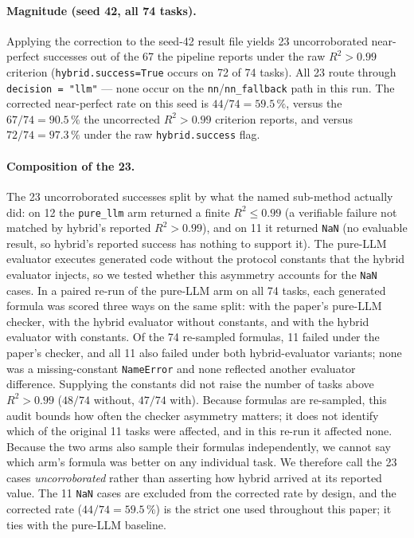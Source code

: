 \documentclass[twoside,11pt]{article}
\newcommand{\Rsq}{R^{2}}
\begin{document}
\paragraph{Magnitude (seed 42, all 74 tasks).}
Applying the correction to
the seed-42 result file yields
23 uncorroborated near-perfect successes out of the 67 the pipeline reports
under the raw $\Rsq>0.99$ criterion (\texttt{hybrid.success=True} occurs
on 72 of 74 tasks). All 23 route through
\texttt{decision = "llm"} --- none occur on the
\texttt{nn}/\texttt{nn\_fallback} path in this run. The corrected
near-perfect rate on this seed is $44/74 = 59.5\,\%$, versus the
$67/74 = 90.5\,\%$ the uncorrected $\Rsq>0.99$ criterion reports, and
versus $72/74=97.3\,\%$ under the raw \texttt{hybrid.success} flag.


\paragraph{Composition of the 23.} The 23 uncorroborated
successes split by what the named sub-method actually did: on 12 the
\texttt{pure\_llm} arm returned a finite $\Rsq\le0.99$ (a verifiable
failure not matched by hybrid's reported $\Rsq>0.99$), and on 11 it returned
\texttt{NaN} (no evaluable result, so hybrid's reported success has nothing to
support it). The pure-LLM evaluator executes generated code without the
protocol constants that the hybrid evaluator injects, so we tested whether
this asymmetry accounts for the \texttt{NaN} cases. In a paired re-run of the
pure-LLM arm on all 74 tasks, each generated formula was scored three ways on
the same split: with the paper's pure-LLM checker, with the hybrid evaluator
without constants, and with the hybrid evaluator with constants. Of the 74
re-sampled formulas, 11 failed under the paper's checker, and all 11 also
failed under both hybrid-evaluator variants; none was a missing-constant
\texttt{NameError} and none reflected another evaluator difference.
Supplying the constants did not raise the number of tasks above
$\Rsq>0.99$ ($48/74$ without, $47/74$ with). Because formulas are
re-sampled, this audit bounds how often the checker asymmetry matters; it does
not identify which of the original 11 tasks were affected, and in this re-run
it affected none. Because the two arms also sample their formulas independently,
we cannot say which arm's formula was better on any individual task. We
therefore call the 23 cases \emph{uncorroborated} rather than asserting how
hybrid arrived at its reported value. The 11 \texttt{NaN} cases are excluded
from the corrected rate by design, and the corrected rate
($44/74 = 59.5\,\%$) is the strict one used throughout this paper; it ties
with the pure-LLM baseline.
\end{document}
